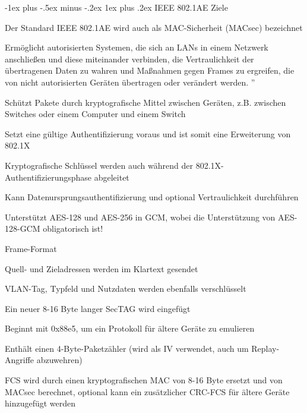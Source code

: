 \documentclass[a4paper]{article}
\makeatletter
\renewcommand{\subsubsection}{\@startsection{subsubsection}{3}{0mm}%
 {-1ex plus -.5ex minus -.2ex}%
 {1ex plus .2ex}%
 {\normalfont\small\bfseries}}
\makeatother
\begin{document}
\begin{multicols}{3}
      \subsubsection{IEEE 802.1AE}
      Ziele
      \begin{itemize*}
            \item Der Standard IEEE 802.1AE wird auch als MAC-Sicherheit (MACsec) bezeichnet
            \item Ermöglicht autorisierten Systemen, die sich an LANs in einem Netzwerk anschließen und diese miteinander verbinden, die Vertraulichkeit der übertragenen Daten zu wahren und Maßnahmen gegen Frames zu ergreifen, die von nicht autorisierten Geräten übertragen oder verändert werden. ''
            \item Schützt Pakete durch kryptografische Mittel zwischen Geräten, z.B. zwischen Switches oder einem Computer und einem Switch
            \item Setzt eine gültige Authentifizierung voraus und ist somit eine Erweiterung von 802.1X
            \item Kryptografische Schlüssel werden auch während der 802.1X-Authentifizierungsphase abgeleitet
            \item Kann Datenursprungsauthentifizierung und optional Vertraulichkeit durchführen
            \item Unterstützt AES-128 und AES-256 in GCM, wobei die Unterstützung von AES-128-GCM obligatorisch ist!
      \end{itemize*}

      Frame-Format
      \begin{itemize*}
            \item Quell- und Zieladressen werden im Klartext gesendet
            \item VLAN-Tag, Typfeld und Nutzdaten werden ebenfalls verschlüsselt
            \item Ein neuer 8-16 Byte langer SecTAG wird eingefügt
            \begin{itemize*}
                  \item Beginnt mit 0x88e5, um ein Protokoll für ältere Geräte zu emulieren
                  \item Enthält einen 4-Byte-Paketzähler (wird als IV verwendet, auch um Replay-Angriffe abzuwehren)
            \end{itemize*}
            \item FCS wird durch einen kryptografischen MAC von 8-16 Byte ersetzt und von MACsec berechnet, optional kann ein zusätzlicher CRC-FCS für ältere Geräte hinzugefügt werden
      \end{itemize*}


\end{multicols}
\end{document}
